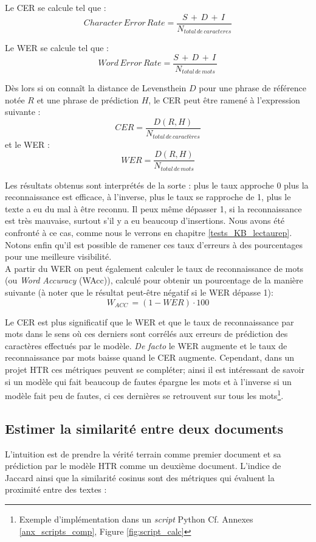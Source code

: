 Le CER se calcule tel que : $$ Character\, Error\, Rate = \frac{S\, + \,D\, + \,I\,}{N_{total\, de\, caracteres}} $$

Le WER se calcule tel que : $$ Word\, Error\, Rate = \frac{S\, + \,D\, + \,I\,}{N_{total\, de\, mots}} $$

Dès lors si on connaît la distance de Levensthein $D$ pour une phrase de référence notée $R$ et une phrase de prédiction $H$, le CER peut être ramené à l'expression suivante : $$CER = \frac{D(R,H)}{N_{total\, de\, caractères}}$$  et le WER :$$WER = \frac{D(R,H)}{N_{total\, de\, mots}}$$

Les résultats obtenus sont interprétés de la sorte : plus le taux approche 0 plus la reconnaissance est efficace, à l'inverse, plus le taux se rapproche de 1, plus le texte a eu du mal à être reconnu. Il peux même dépasser 1, si la reconnaissance est très mauvaise, surtout s'il y a eu beaucoup d'insertions. Nous avons été confronté à ce cas, comme nous le verrons en chapitre \ref{tests_KB_lectaurep}. Notons enfin qu'il est possible de ramener ces taux d'erreurs à des pourcentages pour une meilleure visibilité.\\

A partir du WER on peut également calculer le taux de reconnaissance de mots (ou \textit{Word Accuracy} (WAcc)), calculé pour obtenir un pourcentage de la manière suivante (à noter que le résultat peut-être négatif si le WER dépasse 1): $$W_{ACC}\, = (1 - WER) \cdot 100  $$

Le CER est plus significatif que le WER et que le taux de reconnaissance par mots dans le sens où ces derniers sont corrélés aux erreurs de prédiction des caractères effectués par le modèle. \textit{De facto} le WER augmente et le taux de reconnaissance par mots baisse quand le CER augmente. Cependant, dans un projet HTR ces métriques peuvent se compléter; ainsi il est intéressant de savoir si un modèle qui fait beaucoup de fautes épargne les mots et à l'inverse si un modèle fait peu de fautes, ci ces dernières se retrouvent sur tous les mots\footnote{Exemple d'implémentation dans un \textit{script} Python Cf. Annexes \ref{anx_scripts_comp}, Figure \ref{fig:script_calc}}.

\subsection{Estimer la similarité entre deux documents}

L'intuition est de prendre la vérité terrain comme premier document et sa prédiction par le modèle HTR comme un deuxième document. L'indice de Jaccard ainsi que la similarité cosinus sont des métriques qui évaluent la proximité entre des textes :\\

